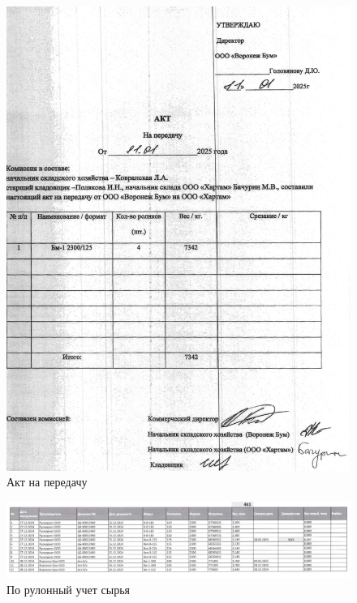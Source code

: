 \begin{figure}
\begin{center}
\includegraphics[height=0.94\textheight, width=\textwidth, keepaspectratio]{Pics/f13.jpg}
\end{center}
\caption{Акт на передачу}
\label{pic:f13}
\end{figure}

\begin{figure}
\begin{center}
\includegraphics[height=0.94\textheight, width=\textwidth, angle=90, keepaspectratio]{Pics/f1.jpg}
\end{center}
\caption{По рулонный учет сырья}
\label{pic:f1}
\end{figure}

